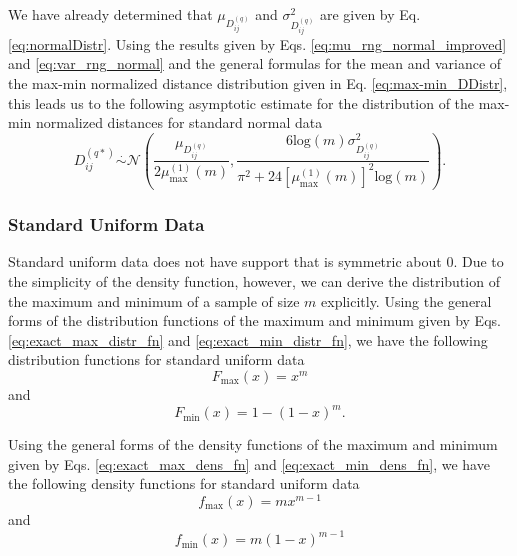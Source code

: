 \documentclass[10pt,letterpaper]{article}\usepackage[]{graphicx}\usepackage[]{color}
\begin{document}
  We have already determined that $\mu_{D^{(q)}_{ij}}$ and $\sigma^2_{D^{(q)}_{ij}}$ are given by Eq. \ref{eq:normalDistr}. Using the results given by Eqs. \ref{eq:mu_rng_normal_improved} and \ref{eq:var_rng_normal} and the general formulas for the mean and variance of the max-min normalized distance distribution given in Eq. \ref{eq:max-min_DDistr}, this leads us to the following asymptotic estimate for the distribution of the max-min normalized distances for standard normal data
%
\begin{equation}\label{eq:max-min_DDistr_normal}
D^{(q*)}_{ij} \overset{.}{\sim} \mathcal{N}\left(\frac{\mu_{D^{(q)}_{ij}}}{2\mu^{(1)}_\text{max}(m)}, \frac{6 \text{log}(m) \sigma^2_{D^{(q)}_{ij}}}{\pi^2 + 24 \left[\mu^{(1)}_\text{max}(m)\right]^2 \text{log}(m)}\right).
\end{equation}

\subsubsection{Standard Uniform Data}

Standard uniform data does not have support that is symmetric about 0. Due to the simplicity of the density function, however, we can derive the distribution of the maximum and minimum of a sample of size $m$ explicitly. Using the general forms of the distribution functions of the maximum and minimum given by Eqs. \ref{eq:exact_max_distr_fn} and \ref{eq:exact_min_distr_fn}, we have the following distribution functions for standard uniform data
%
\begin{equation}\label{eq:uniform_max_distr}
F_\text{max}(x) = x^m
\end{equation}
%
and
%
\begin{equation}\label{eq:uniform_min_distr}
F_\text{min}(x) = 1 - (1 - x)^m.
\end{equation}

Using the general forms of the density functions of the maximum and minimum given by Eqs. \ref{eq:exact_max_dens_fn} and \ref{eq:exact_min_dens_fn}, we have the following density functions for standard uniform data
%
\begin{equation}\label{eq:uniform_max_dens}
f_\text{max}(x) = m x^{m-1}
\end{equation}
%
and
%
\begin{equation}\label{eq:uniform_min_dens}
f_\text{min}(x) = m(1 - x)^{m-1}
\end{equation}
\end{document}
